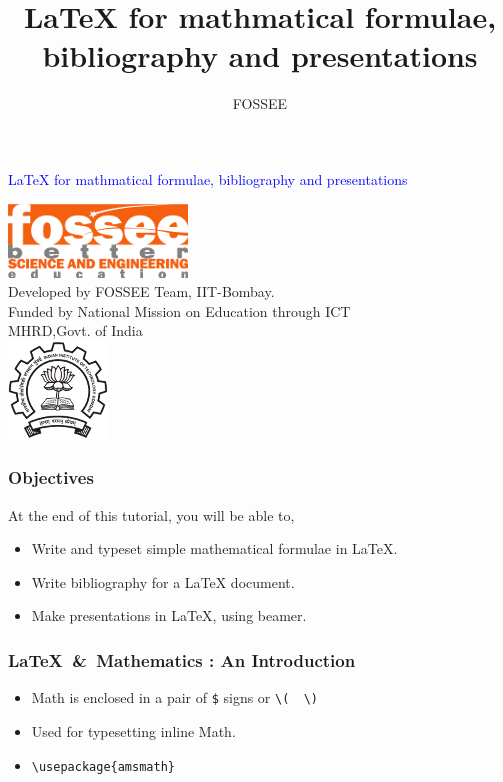 \documentclass{beamer}
\title [{\LaTeX} for mathematics \& beyond] {{\LaTeX} for mathmatical formulae, bibliography and presentations}
\author {FOSSEE}
\begin{document}
\begin{frame}
  \begin{center}
    \vspace{12pt}
    \textcolor{blue}{\huge {\LaTeX} for mathmatical formulae, bibliography and presentations}
  \end{center}
  \vspace{18pt}
  \begin{center}
    \vspace{10pt}
    \includegraphics[scale=0.95]{../images/fossee-logo.png}\\
    \vspace{5pt}
    \scriptsize Developed by FOSSEE Team, IIT-Bombay. \\ 
    \scriptsize Funded by National Mission on Education through ICT\\
    \scriptsize  MHRD,Govt. of India\\
    \includegraphics[scale=0.30]{../images/iitb-logo.png}\\
  \end{center}
\end{frame}

\begin{frame}
  \frametitle{Objectives}
  \label{sec-2}
    At the end of this tutorial, you will be able to,
  \begin{itemize}
    \item Write and typeset simple mathematical formulae in LaTeX.
    \item Write bibliography for a LaTeX document.
    \item Make presentations in LaTeX, using beamer.
  \end{itemize}
\end{frame}

\begin{frame}[fragile]
  \frametitle{\LaTeX\ \&\ Mathematics : An Introduction}
  \begin{itemize}
  \item Math is enclosed in a pair of \lstinline{$} signs or %
    \lstinline+\(  \)+ 
  \item Used for typesetting inline Math. 
  \item \lstinline+\usepackage{amsmath}+
  \end{itemize}
\end{frame}
\end{document}
